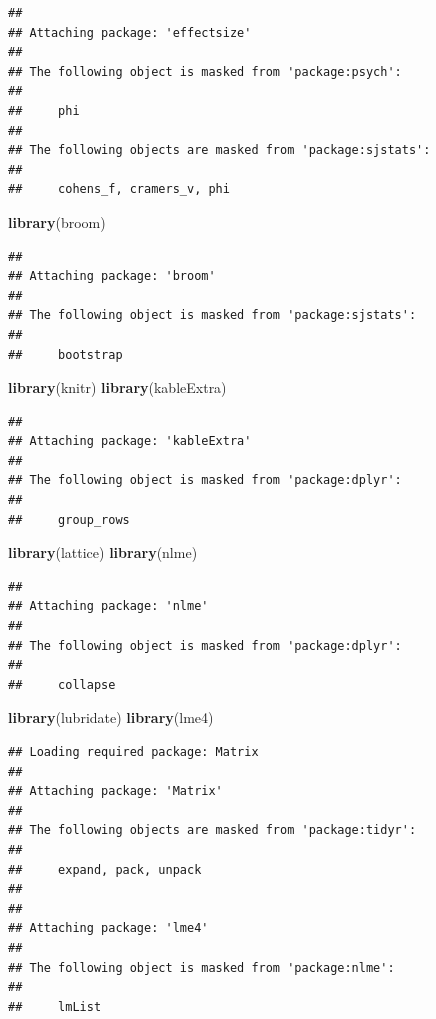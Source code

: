 \documentclass[
]{article}
\newenvironment{Shaded}{\begin{snugshade}}{\end{snugshade}}
\newcommand{\FunctionTok}[1]{\textcolor[rgb]{0.13,0.29,0.53}{\textbf{#1}}}
\newcommand{\NormalTok}[1]{#1}
\begin{document}
\begin{verbatim}
## 
## Attaching package: 'effectsize'
## 
## The following object is masked from 'package:psych':
## 
##     phi
## 
## The following objects are masked from 'package:sjstats':
## 
##     cohens_f, cramers_v, phi
\end{verbatim}

\begin{Shaded}
\begin{Highlighting}[]
\FunctionTok{library}\NormalTok{(broom)}
\end{Highlighting}
\end{Shaded}

\begin{verbatim}
## 
## Attaching package: 'broom'
## 
## The following object is masked from 'package:sjstats':
## 
##     bootstrap
\end{verbatim}

\begin{Shaded}
\begin{Highlighting}[]
\FunctionTok{library}\NormalTok{(knitr)}
\FunctionTok{library}\NormalTok{(kableExtra)}
\end{Highlighting}
\end{Shaded}

\begin{verbatim}
## 
## Attaching package: 'kableExtra'
## 
## The following object is masked from 'package:dplyr':
## 
##     group_rows
\end{verbatim}

\begin{Shaded}
\begin{Highlighting}[]
\FunctionTok{library}\NormalTok{(lattice)}
\FunctionTok{library}\NormalTok{(nlme)}
\end{Highlighting}
\end{Shaded}

\begin{verbatim}
## 
## Attaching package: 'nlme'
## 
## The following object is masked from 'package:dplyr':
## 
##     collapse
\end{verbatim}

\begin{Shaded}
\begin{Highlighting}[]
\FunctionTok{library}\NormalTok{(lubridate)}
\FunctionTok{library}\NormalTok{(lme4)}
\end{Highlighting}
\end{Shaded}

\begin{verbatim}
## Loading required package: Matrix
## 
## Attaching package: 'Matrix'
## 
## The following objects are masked from 'package:tidyr':
## 
##     expand, pack, unpack
## 
## 
## Attaching package: 'lme4'
## 
## The following object is masked from 'package:nlme':
## 
##     lmList
\end{verbatim}
\end{document}

